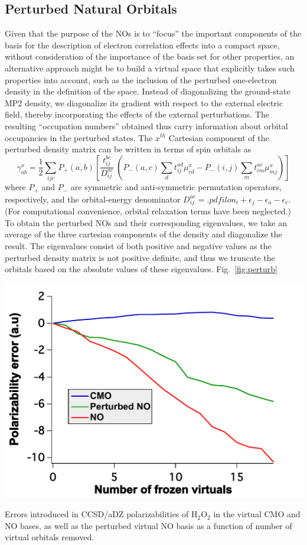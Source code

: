 \subsection{Perturbed Natural Orbitals}

Given that the purpose of the NOs is to ``focus'' the important components of
the basis for the description of electron correlation effects into a compact
space, without consideration of the importance of the basis set for other
properties, an alternative approach might be to build a virtual space that
explicitly takes such properties into account, such as the inclusion of the
perturbed one-electron density in the definition of the space.  Instead of
diagonalizing the ground-state MP2 density, we diagonalize its gradient with
respect to the external electric field, thereby incorporating the effects of
the external perturbations.  The resulting ``occupation numbers'' obtained
thus carry information about orbital occupancies in the perturbed states.  The
$x^{th}$ Cartesian component of the perturbed density matrix can be written in
terms of spin orbitals as
\begin{equation}
\gamma^x_{ab} = \frac{1}{2}\sum_{ijc}P_{+}(a,b)\left[\frac{t^{bc}_{ij}}{D^{ac}_{ij}} \
\left(P_{-}(a,c)\sum_dt^{ad}_{ij}\mu^x_{cd} - P_{-}(i,j)\sum_m t^{ac}_{im}\mu^x_{mj}\right)\right]
\label{Eq:perturb_d}
\end{equation}
where $P_{+}$ and $P_{-}$ are symmetric and anti-symmetric permutation
operators, respectively, and the orbital-energy denominator $D^{ac}_{ij} =
.pdfilon_i + \epsilon_j  -\epsilon_a -\epsilon_c $.  (For computational
convenience, orbital relaxation terms have been neglected.) To obtain the
perturbed NOs and their corresponding eigenvalues, we take an average of the
three cartesian components of the density and diagonalize the result.
The eigenvalues consist of both positive and negative values as the perturbed
density matrix is not positive definite, and thus we truncate the orbitals
based on the absolute values of these eigenvalues.
Fig.~\ref{fig:perturb} 
\begin{MyFigure}[h!]
\centering
\includegraphics[width=0.6\linewidth,natwidth=610,natheight=642]{figures_fvno/perturbed.pdf}
\caption{{\footnotesize Errors introduced in CCSD/aDZ polarizabilities of
H$_2$O$_2$ in the virtual CMO and NO bases, as well as the perturbed
virtual NO basis as a function of number of virtual orbitals removed.}}
\label{fig:perturb}
\end{MyFigure}
